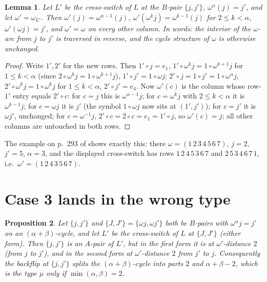 \documentclass[11pt]{article}
\newtheorem{lemma}{Lemma}
\newtheorem{proposition}[lemma]{Proposition}
\theoremstyle{remark}
\begin{document}
\begin{lemma}\label{lem:rev}
Let $L'$ be the cross-switch of $L$ at the $B$-pair $\{j,j'\}$,
$\omega^\alpha(j)=j'$, and let $\omega'=\omega_{L'}$.  Then
$\omega'(j)=\omega^{\alpha-1}(j)$, $\omega'(\omega^kj)=\omega^{k-1}(j)$
for $2\le k<\alpha$, $\omega'(\omega j)=j'$, and $\omega'=\omega$ on
every other column.  In words: the interior of the $\omega$-arc from $j$
to $j'$ is traversed in reverse, and the cycle structure of $\omega$ is
otherwise unchanged.
\end{lemma}

\begin{proof}
Write $1',2'$ for the new rows.  Then $1'\circ j=e_1$,
$1'\circ\omega^kj=1\circ\omega^{k+1}j$ for $1\le k<\alpha$ (since
$2\circ\omega^kj=1\circ\omega^{k+1}j$), $1'\circ j'=1\circ\omega j$;
$2'\circ j=1\circ j'=1\circ\omega^\alpha j$,
$2'\circ\omega^kj=1\circ\omega^kj$ for $1\le k<\alpha$, $2'\circ j'=e_4$.
Now $\omega'(c)$ is the column whose row-$1'$ entry equals $2'\circ c$:
for $c=j$ this is $\omega^{\alpha-1}j$; for $c=\omega^kj$ with
$2\le k<\alpha$ it is $\omega^{k-1}j$; for $c=\omega j$ it is $j'$
(the symbol $1\circ\omega j$ now sits at $(1',j')$); for $c=j'$ it is
$\omega j'$, unchanged; for $c=\omega^{-1}j$, $2'\circ c=2\circ c=e_1=1'\circ j$,
so $\omega'(c)=j$; all other columns are untouched in both rows.
\end{proof}

The example on p.~293 of \cite{CGW08} shows exactly this: there
$\omega=(1\,2\,3\,4\,5\,6\,7)$, $j=2$, $j'=5$, $\alpha=3$, and the
displayed cross-switch has rows $1\,2\,4\,5\,3\,6\,7$ and
$2\,5\,3\,4\,6\,7\,1$, i.e.\ $\omega'=(1\,2\,4\,3\,5\,6\,7)$.

\section{Case 3 lands in the wrong type}

\begin{proposition}\label{prop:gap}
Let $\{j,j'\}$ and $\{J,J'\}=\{\omega j,\omega j'\}$ both be $B$-pairs
with $\omega^\alpha j=j'$ on an $(\alpha+\beta)$-cycle, and let $L'$ be
the cross-switch of $L$ at $\{J,J'\}$ (either form).  Then $\{j,j'\}$ is
an $A$-pair of $L'$, but in the first form it is at $\omega'$-distance
$2$ (from $j$ to $j'$), and in the second form at $\omega'$-distance $2$
from $j'$ to $j$.  Consequently the backflip at $\{j,j'\}$ splits the
$(\alpha+\beta)$-cycle into parts $2$ and $\alpha+\beta-2$, which is
the type $\mu$ only if $\min(\alpha,\beta)=2$.
\end{proposition}
\end{document}
